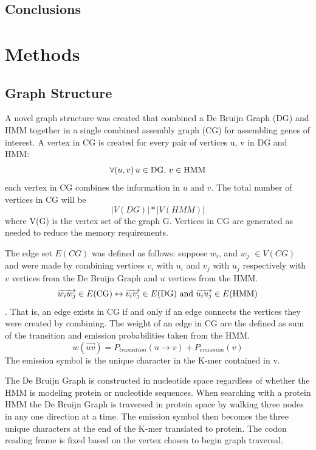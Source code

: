 \documentclass[10pt]{bmc_article}
\newenvironment{bmcformat}{\begin{raggedright}\baselineskip20pt\sloppy\setboolean{publ}{false}}{\end{raggedright}\baselineskip20pt\sloppy}
\begin{document}
\begin{bmcformat}
\subsection*{Conclusions}
  
\section*{Methods}
\subsection*{Graph Structure}
A novel graph structure was created that combined a De Bruijn Graph (DG) and HMM together in a single combined assembly graph (CG) for assembling genes of interest.  A vertex in CG is created for every pair of vertices u, v in DG and HMM:
\[ \forall (u,v)\, u\in \textnormal{DG, }v\in \textnormal{HMM} \] each vertex in CG combines the information in $u$ and $v$.
The total number of vertices in CG will be \[|V(DG)| * |V(HMM)|\] where V(G) is the vertex set of the graph G.  Vertices in CG are generated as needed to reduce the memory requirements.

The edge set $E(CG)$ was defined as follows: suppose $w_i$, and $w_j$ \(\in V(CG) \) and were made by combining vertices $v_i$ with $u_i$ and $v_j$ with $u_j$ respectively with $v$ vertices from the De Bruijn Graph and $u$ vertices from the HMM.
\[\overrightarrow{w_iw_j} \in E(\textnormal{CG}) \leftrightarrow \overrightarrow{v_iv_j} \in 
E(\textnormal{DG})\textnormal{ and } \overrightarrow{u_iu_j} \in E(\textnormal{HMM})\].
That is, an edge exists in CG if and only if an edge connects the vertices they were created by combining.
The weight of an edge  in CG are the defined as sum of the transition and emission probabilities taken from the HMM.  
\[ w(\overrightarrow{uv}) = P_{transition}(u \rightarrow v) + P_{emission}(v) \]
The emission symbol is the unique character in the K-mer contained in v.

The De Bruijn Graph is constructed in nucleotide space regardless of whether the HMM is modeling protein or nucleotide sequences.  When searching with a protein HMM the De Bruijn Graph is traversed in protein space by walking three nodes in any one direction at a time.  The emission symbol then becomes the three unique characters at the end of the K-mer translated to protein.  The codon reading frame is fixed based on the vertex chosen to begin graph traversal.


\end{bmcformat}
\end{document}
